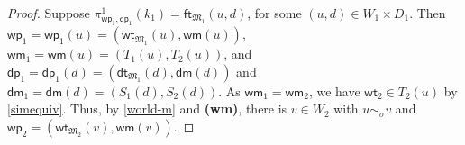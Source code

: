 \documentclass{lmcs} %
\theoremstyle{plain}\newtheorem{satz}[thm]{Satz} %
\newcommand{\wt}{\mathsf{wt}}
\newcommand{\dt}{\mathsf{dt}}
\newcommand{\ft}{\mathsf{ft}}
\newcommand{\wm}{\mathsf{wm}}
\newcommand{\dm}{\mathsf{dm}}
\newcommand{\owp}{\mathsf{wp}_1}
\newcommand{\twp}{\mathsf{wp}_2}
\newcommand{\odp}{\mathsf{dp}_1}
\begin{document}
\begin{proof}
	
	Suppose $\pi^1_{\owp,\odp}(k_1) = \ft_{\mathfrak{M}_{1}}(u,d)$, for some $(u,d)\in W_{1} \times D_{1}$. Then $\owp = \owp(u) = (\wt_{\mathfrak M_1}(u), \wm(u) )$, $\wm_1 = \wm(u) = (T_1(u), T_2(u))$, and $\odp = \odp(d) = (\dt_{\mathfrak M_1}(d), \dm(d) )$ and $\dm_1 = \dm(d) = (S_1(d), S_2(d))$. 
	As $\wm_1 = \wm_2$, we have $\wt_2 \in T_2(u)$ by \eqref{simequiv}. Thus, by \eqref{world-m} and  {\bf (wm)},
	there is $v \in W_2$ with $u \sim_\sigma v$ and $\twp = (\wt_{\mathfrak M_2}(v), \wm(v) )$.
	
	
	

\end{proof}
\end{document}
